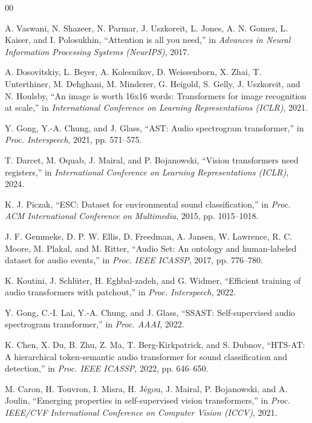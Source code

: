\documentclass[conference]{IEEEtran}
\begin{document}
\begin{thebibliography}{00}

A. Vaswani, N. Shazeer, N. Parmar, J. Uszkoreit, L. Jones, A. N. Gomez, L. Kaiser, and I. Polosukhin, ``Attention is all you need,'' in \emph{Advances in Neural Information Processing Systems (NeurIPS)}, 2017.

A. Dosovitskiy, L. Beyer, A. Kolesnikov, D. Weissenborn, X. Zhai, T. Unterthiner, M. Dehghani, M. Minderer, G. Heigold, S. Gelly, J. Uszkoreit, and N. Houlsby, ``An image is worth 16x16 words: Transformers for image recognition at scale,'' in \emph{International Conference on Learning Representations (ICLR)}, 2021.

Y. Gong, Y.-A. Chung, and J. Glass, ``AST: Audio spectrogram transformer,'' in \emph{Proc. Interspeech}, 2021, pp. 571--575.

T. Darcet, M. Oquab, J. Mairal, and P. Bojanowski, ``Vision transformers need registers,'' in \emph{International Conference on Learning Representations (ICLR)}, 2024.

K. J. Piczak, ``ESC: Dataset for environmental sound classification,'' in \emph{Proc. ACM International Conference on Multimedia}, 2015, pp. 1015--1018.

J. F. Gemmeke, D. P. W. Ellis, D. Freedman, A. Jansen, W. Lawrence, R. C. Moore, M. Plakal, and M. Ritter, ``Audio Set: An ontology and human-labeled dataset for audio events,'' in \emph{Proc. IEEE ICASSP}, 2017, pp. 776--780.

K. Koutini, J. Schl\"uter, H. Eghbal-zadeh, and G. Widmer, ``Efficient training of audio transformers with patchout,'' in \emph{Proc. Interspeech}, 2022.

Y. Gong, C.-I. Lai, Y.-A. Chung, and J. Glass, ``SSAST: Self-supervised audio spectrogram transformer,'' in \emph{Proc. AAAI}, 2022.

K. Chen, X. Du, B. Zhu, Z. Ma, T. Berg-Kirkpatrick, and S. Dubnov, ``HTS-AT: A hierarchical token-semantic audio transformer for sound classification and detection,'' in \emph{Proc. IEEE ICASSP}, 2022, pp. 646--650.

M. Caron, H. Touvron, I. Misra, H. J\'egou, J. Mairal, P. Bojanowski, and A. Joulin, ``Emerging properties in self-supervised vision transformers,'' in \emph{Proc. IEEE/CVF International Conference on Computer Vision (ICCV)}, 2021.


\end{thebibliography}
\end{document}
